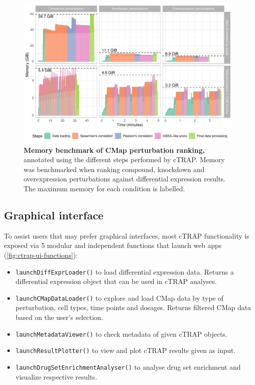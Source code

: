 \begin{figure}[!ht]
  \includegraphics[width=\textwidth]{images/ctrap/ranking-memory}
  \centering
  \caption[Memory benchmark of CMap perturbation ranking]{\textbf{Memory benchmark of CMap perturbation ranking,} annotated using the different steps performed by cTRAP. Memory was benchmarked when ranking compound, knockdown and overexpression perturbations against differential expression results. The maximum memory for each condition is labelled.}
  \label{fig:cmap-ranking-memory}
\end{figure}

\subsection{Graphical interface}

To assist users that may prefer graphical interfaces, most cTRAP functionality is exposed via 5 modular and independent functions that launch web apps (\autoref{fig:ctrap-ui-functions}):

\begin{itemize}
	\item \texttt{launchDiffExprLoader()} to load differential expression data. Returns a differential expression object that can be used in cTRAP analyses.
	\item \texttt{launchCMapDataLoader()} to explore and load CMap data by type of perturbation, cell types, time points and dosages. Returns filtered CMap data based on the user's selection.
	\item \texttt{launchMetadataViewer()} to check metadata of given cTRAP objects.
	\item \texttt{launchResultPlotter()} to view and plot cTRAP results given as input.
	\item \texttt{launchDrugSetEnrichmentAnalyser()} to analyse drug set enrichment and visualize respective results.
\end{itemize}

